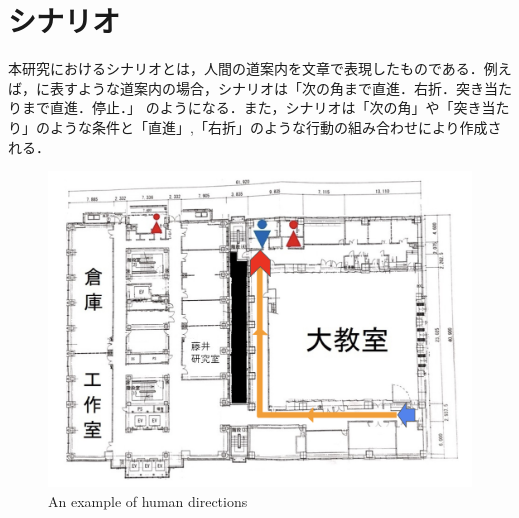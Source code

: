 \documentclass[../main]{subfiles}
\begin{document}
        \newpage

         \section{シナリオ}
             本研究におけるシナリオとは，人間の道案内を文章で表現したものである．例えば，に表すような道案内の場合，シナリオは「次の角まで直進．右折．突き当たりまで直進．停止．」
             のようになる．また，シナリオは「次の角」や「突き当たり」のような条件と「直進」,「右折」のような行動の組み合わせにより作成される．
             
        
         \begin{figure}[H]
          \centering
          \includegraphics[width=12cm]{../images/scenario_fig}
          \caption{An example of human directions}
          \label{figure::scenario_exp}
         \end{figure}

         \newpage
          
\end{document}
